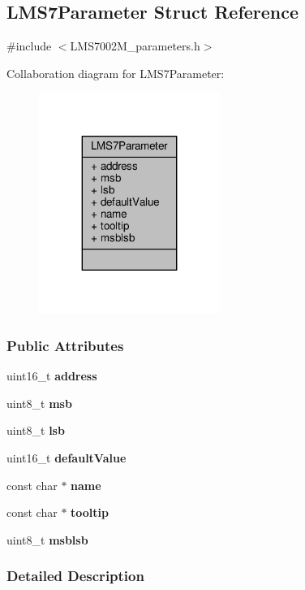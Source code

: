 \subsection{L\+M\+S7\+Parameter Struct Reference}
\label{structLMS7Parameter}


{\ttfamily \#include $<$L\+M\+S7002\+M\+\_\+parameters.\+h$>$}



Collaboration diagram for L\+M\+S7\+Parameter\+:
\nopagebreak
\begin{figure}[H]
\begin{center}
\leavevmode
\includegraphics[width=167pt]{d3/d6d/structLMS7Parameter__coll__graph}
\end{center}
\end{figure}
\subsubsection*{Public Attributes}
\begin{DoxyCompactItemize}
\item 
uint16\+\_\+t {\bf address}
\item 
uint8\+\_\+t {\bf msb}
\item 
uint8\+\_\+t {\bf lsb}
\item 
uint16\+\_\+t {\bf default\+Value}
\item 
const char $\ast$ {\bf name}
\item 
const char $\ast$ {\bf tooltip}
\item 
uint8\+\_\+t {\bf msblsb}
\end{DoxyCompactItemize}


\subsubsection{Detailed Description}


